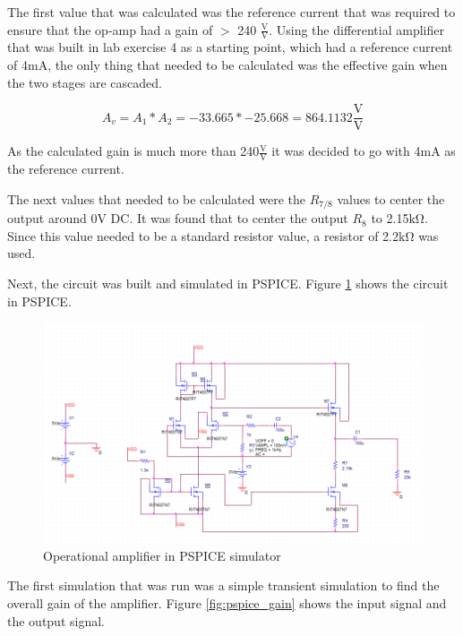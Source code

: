 \documentclass[11pt]{article}
\begin{document}
	The first value that was calculated was the reference current that was required
	to ensure that the op-amp had a gain of $>$ 240 $\frac{\si\volt}{\si\volt}$. Using the
	differential amplifier that was built in lab exercise 4 as a starting point, which had a
	reference current of 4$\si{\milli\ampere}$, the only thing that needed to be calculated
	was the effective gain when the two stages are cascaded. 

	\begin{equation}
		A_{v} = A_{1} * A_{2} = -33.665 * -25.668 = 864.1132 \frac{\si{\volt}}{\si{\volt}}
	\end{equation}

	As the calculated gain is much more than 240$\frac{\si\volt}{\si\volt}$ it was decided
	to go with 4$\si{\milli\ampere}$ as the reference current. \\
	\hfill\break

	The next values that needed to be calculated were the $R_{7/8}$ values to center 
	the output around 0$\si\volt$ DC. It was found that to center the output $R_8$ to
	2.15$\si{\kilo\ohm}$. Since this value needed to be a standard resistor value, a
	resistor of 2.2$\si{\kilo\ohm}$ was used. \\
	\hfill\break

	Next, the circuit was built and simulated in PSPICE. Figure \ref{fig:pspice_opamp}
	shows the circuit in PSPICE.

	\begin{figure}[H]
		\includegraphics[width=\textwidth]{op_amp.png}
		\caption{Operational amplifier in PSPICE simulator}
		\label{fig:pspice_opamp}
	\end{figure}

	The first simulation that was run was a simple transient simulation to find the 
	overall gain of the amplifier. Figure \ref{fig:pspice_gain} shows the input
	signal and the output signal. 
\end{document}
